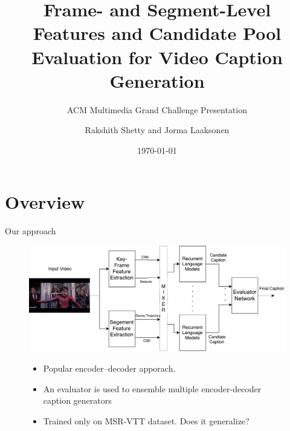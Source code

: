 \documentclass{beamer}
\begin{document}

\title{Frame- and Segment-Level Features and Candidate Pool Evaluation for Video Caption Generation}
\subtitle{ACM Multimedia Grand Challenge Presentation}
\author[Rakshith Shetty and Jorma Laaksonen]{Rakshith Shetty and Jorma Laaksonen}
\date{\today}

\frame{\titlepage} 


\section{Overview}
\begin{frame}{Our approach}
\begin{figure}[h]
    \centering
    \includegraphics[width=1.0\textwidth]{images/MMGC_Overview.pdf}
\begin{itemize}
    \item Popular encoder--decoder apporach.
    \item An evaluator is used to ensemble multiple encoder-decoder caption generators 
    \item Trained only on MSR-VTT dataset. Does it generalize? 
\end{itemize}
\end{figure}
\end{frame}
\end{document}
